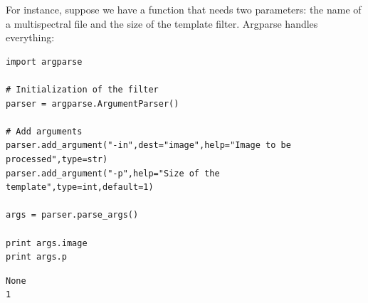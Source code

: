 \documentclass[a4paper,11pt,DIV=18]{scrartcl}
\begin{document}
For instance,  suppose we have  a function that needs  two parameters:
the  name  of a  multispectral  file  and  the  size of  the  template
filter. Argparse handles everything:

\begin{verbatim}
import argparse

# Initialization of the filter
parser = argparse.ArgumentParser()

# Add arguments
parser.add_argument("-in",dest="image",help="Image to be processed",type=str)
parser.add_argument("-p",help="Size of the template",type=int,default=1)

args = parser.parse_args()

print args.image
print args.p
\end{verbatim}

\begin{verbatim}
None
1
\end{verbatim}
\end{document}
